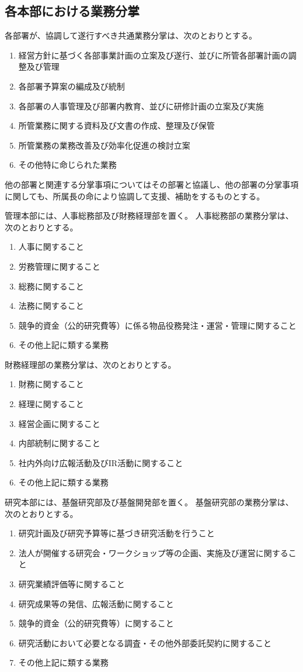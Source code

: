 \documentclass[10pt,a4paper,uplatex,dvipdfmx]{jsarticle}
\begin{document}
\subsection{各本部における業務分掌}
各部署が、協調して遂行すべき共通業務分掌は、次のとおりとする。
\begin{enumerate}
	\item 経営方針に基づく各部事業計画の立案及び遂行、並びに所管各部署計画の調整及び管理
	\item 各部署予算案の編成及び統制
	\item 各部署の人事管理及び部署内教育、並びに研修計画の立案及び実施
	\item 所管業務に関する資料及び文書の作成、整理及び保管
	\item 所管業務の業務改善及び効率化促進の検討立案
	\item その他特に命じられた業務
\end{enumerate}
\term 他の部署と関連する分掌事項についてはその部署と協議し、他の部署の分掌事項に関しても、所属長の命により協調して支援、補助をするものとする。

管理本部には、人事総務部及び財務経理部を置く。
\term 人事総務部の業務分掌は、次のとおりとする。
\begin{enumerate}
	\item 人事に関すること
	\item 労務管理に関すること
	\item 総務に関すること
	\item 法務に関すること
	\item 競争的資金（公的研究費等）に係る物品役務発注・運営・管理に関すること
	\item その他上記に類する業務
\end{enumerate}

\term 財務経理部の業務分掌は、次のとおりとする。
\begin{enumerate}
	\item 財務に関すること
	\item 経理に関すること
	\item 経営企画に関すること
	\item 内部統制に関すること
	\item 社内外向け広報活動及びIR活動に関すること
	\item その他上記に類する業務
\end{enumerate}

研究本部には、基盤研究部及び基盤開発部を置く。
\term 基盤研究部の業務分掌は、次のとおりとする。
\begin{enumerate}
	\item 研究計画及び研究予算等に基づき研究活動を行うこと
	\item 法人が開催する研究会・ワークショップ等の企画、実施及び運営に関すること
	\item 研究業績評価等に関すること
	\item 研究成果等の発信、広報活動に関すること
	\item 競争的資金（公的研究費等）に関すること
	\item 研究活動において必要となる調査・その他外部委託契約に関すること
	\item その他上記に類する業務
\end{enumerate}
\end{document}
